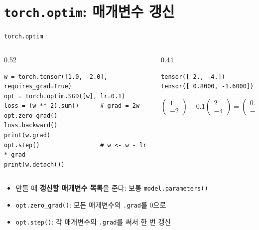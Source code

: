 \documentclass[aspectratio=169,11pt]{beamer}
\newcommand{\code}[1]{\texttt{#1}}
\begin{document}
\section{\texttt{torch.optim}: 매개변수 갱신}

\begin{frame}[fragile]{\code{torch.optim}}
\begin{columns}[T,onlytextwidth]
\begin{column}{0.52\textwidth}
\begin{lstlisting}
w = torch.tensor([1.0, -2.0], requires_grad=True)
opt = torch.optim.SGD([w], lr=0.1)
loss = (w ** 2).sum()      # grad = 2w
opt.zero_grad()
loss.backward()
print(w.grad)
opt.step()                 # w <- w - lr * grad
print(w.detach())
\end{lstlisting}
\end{column}
\begin{column}{0.44\textwidth}
\begin{lstlisting}[style=outstyle]
tensor([ 2., -4.])
tensor([ 0.8000, -1.6000])
\end{lstlisting}
\small
\[
\begin{pmatrix}1\\-2\end{pmatrix}-0.1\begin{pmatrix}2\\-4\end{pmatrix}=\begin{pmatrix}0.8\\-1.6\end{pmatrix}
\]
\end{column}
\end{columns}
\vskip2mm
\begin{itemize}
\item 만들 때 \textbf{갱신할 매개변수 목록}을 준다: 보통 \code{model.parameters()}
\item \code{opt.zero\_grad()}: 모든 매개변수의 \code{.grad}를 0으로
\item \code{opt.step()}: 각 매개변수의 \code{.grad}를 써서 한 번 갱신
\end{itemize}
\end{frame}
\end{document}
